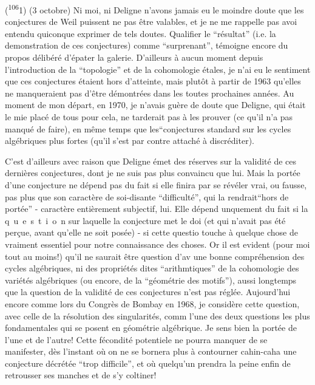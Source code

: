 

(\textsuperscript{106}1) (3 octobre) Ni moi, ni Deligne n'avons jamais eu le moindre doute que les conjectures de Weil puissent ne pas être valables, et je ne me rappelle pas avoi entendu quiconque exprimer de tels doutes. Qualifier le ``résultat'' (i.e. la demonstration de ces conjectures) comme ``surprenant'', témoigne encore du propos délibéré d'épater la galerie. D'ailleurs à aucun moment depuis l'introduction de la ``topologie'' et de la cohomologie étales, je n'ai eu le sentiment que ces conjectures étaient hors d'atteinte, mais plutôt \handwritten{(}à partir de 1963\handwritten{)} qu'elles ne manqueraient pas d'être démontrées dans les toutes prochaines années. Au moment de mon départ, en 1970, je n'avais guère de doute que Deligne, qui était le mie placé de tous pour cela, ne tarderait pas à les prouver (ce qu'il n'a pas manqué de faire), en même temps que les``conjectures standard sur les cycles algébriques plus fortes (qu'il s'est par contre attaché à discréditer).

C'est d'ailleurs avec raison que Deligne émet des réserves sur la validité de ces dernières conjectures, dont je ne suis pas plus convaincu que lui. Mais la portée d'une conjecture ne dépend pas du fait si elle finira par se révéler vrai, ou fausse, pas plus que son caractère de soi-disante ``difficulté'', qui la rendrait``hors de portée'' - caractère entièrement subjectif, lui. Elle dépend unquement du fait si la \mbox{q u e s t i o n} sur laquelle la conjecture met le doi (et qui n'avait pas été perçue, avant qu'elle ne soit posée) - si cette questio touche à quelque chose de vraiment essentiel pour notre connaissance des choses. Or il est evident (pour moi tout au moins!) qu'il ne saurait être question d'av une bonne compréhension des cycles algébriques, ni des propriétés dites ``arithmtiques'' de la cohomologie des variétés algébriques (ou encore, de la ``géométrie des motifs''), aussi longtemps que la question de la validité de ces conjectures n'est pas réglée. Aujourd'hui encore comme lors du Congrès de Bombay en 1968, je considère cette question, avec celle de la résolution des singularités, comm l'une des deux questions les plus fondamentales qui se posent en géométrie algébrique. Je sens bien la portée de l'une et de l'autre! Cette fécondité potentiele ne pourra manquer de se manifester, dès l'instant où on ne se bornera plus à contourner cahin-caha une conjecture décrétée ``trop difficile'', et où quelqu'un prendra la peine enfin de retrousser ses manches et de s'y coltiner!

